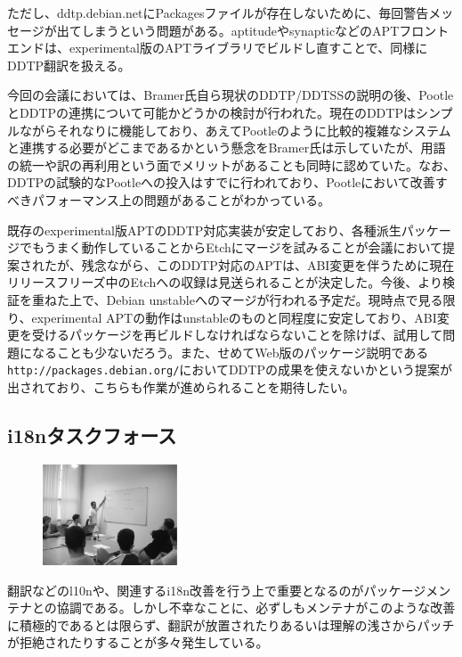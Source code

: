 \documentclass[mingoth,a4paper]{jsarticle}
\begin{document}
\begin{enumerate}
  ただし、ddtp.debian.netにPackagesファイルが存在しないために、毎回警告メッセージが出てしまうという問題がある。aptitudeやsynapticなどのAPTフロントエンドは、experimental版のAPTライブラリでビルドし直すことで、同様にDDTP翻訳を扱える。
\end{enumerate}

今回の会議においては、Bramer氏自ら現状のDDTP/DDTSSの説明の後、PootleとDDTPの連携について可能かどうかの検討が行われた。現在のDDTPはシンプルながらそれなりに機能しており、あえてPootleのように比較的複雑なシステムと連携する必要がどこまであるかという懸念をBramer氏は示していたが、用語の統一や訳の再利用という面でメリットがあることも同時に認めていた。なお、DDTPの試験的なPootleへの投入はすでに行われており、Pootleにおいて改善すべきパフォーマンス上の問題があることがわかっている。

既存のexperimental版APTのDDTP対応実装が安定しており、各種派生パッケージでもうまく動作していることからEtchにマージを試みることが会議において提案されたが、残念ながら、このDDTP対応のAPTは、ABI変更を伴うために現在リリースフリーズ中のEtchへの収録は見送られることが決定した。今後、より検証を重ねた上で、Debian unstableへのマージが行われる予定だ。現時点で見る限り、experimental APTの動作はunstableのものと同程度に安定しており、ABI変更を受けるパッケージを再ビルドしなければならないことを除けば、試用して問題になることも少ないだろう。また、せめてWeb版のパッケージ説明である\texttt{http://packages.debian.org/}においてDDTPの成果を使えないかという提案が出されており、こちらも作業が進められることを期待したい。

\subsection{i18nタスクフォース}
\label{sec:extremadura-taskforce}

\begin{figure}\includegraphics[width=4cm]{image200610/taskforcemeet.eps}\end{figure}

翻訳などのl10nや、関連するi18n改善を行う上で重要となるのがパッケージメンテナとの協調である。しかし不幸なことに、必ずしもメンテナがこのような改善に積極的であるとは限らず、翻訳が放置されたりあるいは理解の浅さからパッチが拒絶されたりすることが多々発生している。
\end{document}
